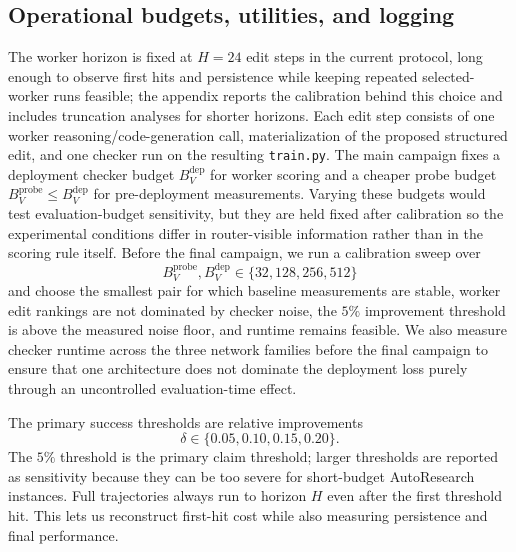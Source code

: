 \documentclass{article}
\begin{document}
\subsection{Operational budgets, utilities, and logging}
\label{subsec:ops}

The worker horizon is fixed at $H=24$ edit steps in the current protocol, long enough to observe first hits and persistence while keeping repeated selected-worker runs feasible; the appendix reports the calibration behind this choice and includes truncation analyses for shorter horizons.
Each edit step consists of one worker reasoning/code-generation call, materialization of the proposed structured edit, and one checker run on the resulting \texttt{train.py}.
The main campaign fixes a deployment checker budget $B_V^{\mathrm{dep}}$ for worker scoring and a cheaper probe budget $B_V^{\mathrm{probe}}\le B_V^{\mathrm{dep}}$ for pre-deployment measurements.
Varying these budgets would test evaluation-budget sensitivity, but they are held fixed after calibration so the experimental conditions differ in router-visible information rather than in the scoring rule itself.
Before the final campaign, we run a calibration sweep over
\[
B_V^{\mathrm{probe}},B_V^{\mathrm{dep}}\in\{32,128,256,512\}
\]
and choose the smallest pair for which baseline measurements are stable, worker edit rankings are not dominated by checker noise, the $5\%$ improvement threshold is above the measured noise floor, and runtime remains feasible.
We also measure checker runtime across the three network families before the final campaign to ensure that one architecture does not dominate the deployment loss purely through an uncontrolled evaluation-time effect.

The primary success thresholds are relative improvements
\[
\delta\in\{0.05,0.10,0.15,0.20\}.
\]
The $5\%$ threshold is the primary claim threshold; larger thresholds are reported as sensitivity because they can be too severe for short-budget AutoResearch instances.
Full trajectories always run to horizon $H$ even after the first threshold hit.
This lets us reconstruct first-hit cost while also measuring persistence and final performance.
\end{document}
